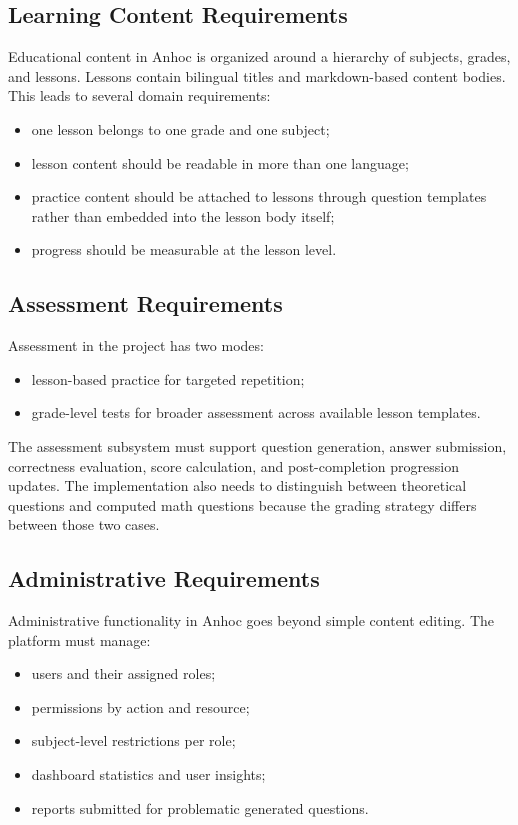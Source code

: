 \subsection{Learning Content Requirements}

Educational content in Anhoc is organized around a hierarchy of subjects, grades, and lessons. Lessons contain bilingual titles and markdown-based content bodies. This leads to several domain requirements:

\begin{itemize}
  \item one lesson belongs to one grade and one subject;
  \item lesson content should be readable in more than one language;
  \item practice content should be attached to lessons through question templates rather than embedded into the lesson body itself;
  \item progress should be measurable at the lesson level.
\end{itemize}

\subsection{Assessment Requirements}

Assessment in the project has two modes:
\begin{itemize}
  \item lesson-based practice for targeted repetition;
  \item grade-level tests for broader assessment across available lesson templates.
\end{itemize}

The assessment subsystem must support question generation, answer submission, correctness evaluation, score calculation, and post-completion progression updates. The implementation also needs to distinguish between theoretical questions and computed math questions because the grading strategy differs between those two cases.

\subsection{Administrative Requirements}

Administrative functionality in Anhoc goes beyond simple content editing. The platform must manage:
\begin{itemize}
  \item users and their assigned roles;
  \item permissions by action and resource;
  \item subject-level restrictions per role;
  \item dashboard statistics and user insights;
  \item reports submitted for problematic generated questions.
\end{itemize}

